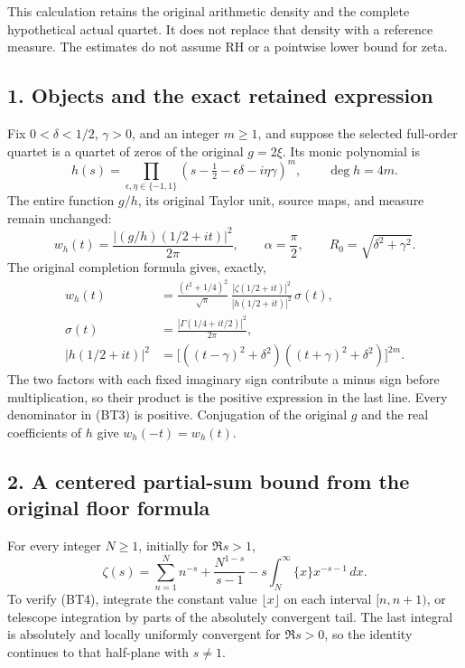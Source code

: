 \documentclass[11pt,a4paper]{article}
\begin{document}
This calculation retains the original arithmetic density and the complete hypothetical actual quartet. It does not replace that density with a reference measure. The estimates do not assume RH or a pointwise lower bound for zeta.

\subsection{1. Objects and the exact retained expression}\label{objects-and-the-exact-retained-expression}

Fix \(0<\delta<1/2\), \(\gamma>0\), and an integer \(m\ge1\), and suppose the selected full-order quartet is a quartet of zeros of the original \(g=2\xi\). Its monic polynomial is \[
h(s)=\prod_{\epsilon,\eta\in\{-1,1\}}
 (s-\tfrac12-\epsilon\delta-i\eta\gamma)^m,
\qquad \deg h=4m.
\tag{BT1}
\] The entire function \(g/h\), its original Taylor unit, source maps, and measure remain unchanged: \[
w_h(t)=\frac{|(g/h)(1/2+it)|^2}{2\pi},\qquad
\alpha=\frac\pi2,\qquad R_0=\sqrt{\delta^2+\gamma^2}.
\tag{BT2}
\] The original completion formula gives, exactly, \[
\begin{split}
w_h(t)
&=\frac{(t^2+1/4)^2}{\sqrt\pi}\,
 \frac{|\zeta(1/2+it)|^2}{|h(1/2+it)|^2}\,\sigma(t),\\
\sigma(t)
&=\frac{|\Gamma(1/4+it/2)|^2}{2\pi},\\
|h(1/2+it)|^2
&=\bigl[((t-\gamma)^2+\delta^2)
              ((t+\gamma)^2+\delta^2)\bigr]^{2m}.
\end{split}
\tag{BT3}
\] The two factors with each fixed imaginary sign contribute a minus sign before multiplication, so their product is the positive expression in the last line. Every denominator in (BT3) is positive. Conjugation of the original \(g\) and the real coefficients of \(h\) give \(w_h(-t)=w_h(t)\).

\subsection{2. A centered partial-sum bound from the original floor formula}\label{a-centered-partial-sum-bound-from-the-original-floor-formula}

For every integer \(N\ge1\), initially for \(\Re s>1\), \[
\zeta(s)=\sum_{n=1}^{N}n^{-s}
 +\frac{N^{1-s}}{s-1}
 -s\int_N^\infty \{x\}x^{-s-1}\,dx.
\tag{BT4}
\] To verify (BT4), integrate the constant value \(\lfloor x\rfloor\) on each interval \([n,n+1)\), or telescope integration by parts of the absolutely convergent tail. The last integral is absolutely and locally uniformly convergent for \(\Re s>0\), so the identity continues to that half-plane with \(s\ne1\).
\end{document}
